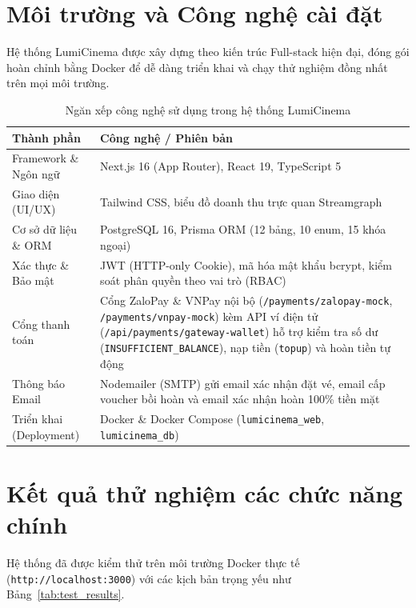 \section{Môi trường và Công nghệ cài đặt}
Hệ thống LumiCinema được xây dựng theo kiến trúc Full-stack hiện đại, đóng gói hoàn chỉnh bằng Docker để dễ dàng triển khai và chạy thử nghiệm đồng nhất trên mọi môi trường.

\begin{table}[H]
\centering
\caption{Ngăn xếp công nghệ sử dụng trong hệ thống LumiCinema}
\label{tab:tech_stack}
\renewcommand{\arraystretch}{1.25}
\begin{tabular}{|p{3.8cm}|p{11.4cm}|}
\hline
\rowcolor{headerblue} \textbf{Thành phần} & \textbf{Công nghệ / Phiên bản} \\ \hline
Framework \& Ngôn ngữ & Next.js 16 (App Router), React 19, TypeScript 5 \\ \hline
Giao diện (UI/UX) & Tailwind CSS, biểu đồ doanh thu trực quan Streamgraph \\ \hline
Cơ sở dữ liệu \& ORM & PostgreSQL 16, Prisma ORM (12 bảng, 10 enum, 15 khóa ngoại) \\ \hline
Xác thực \& Bảo mật & JWT (HTTP-only Cookie), mã hóa mật khẩu bcrypt, kiểm soát phân quyền theo vai trò (RBAC) \\ \hline
Cổng thanh toán & Cổng ZaloPay \& VNPay nội bộ (\texttt{/payments/zalopay-mock}, \texttt{/payments/vnpay-mock}) kèm API ví điện tử (\texttt{/api/payments/gateway-wallet}) hỗ trợ kiểm tra số dư (\texttt{INSUFFICIENT\_BALANCE}), nạp tiền (\texttt{topup}) và hoàn tiền tự động \\ \hline
Thông báo Email & Nodemailer (SMTP) gửi email xác nhận đặt vé, email cấp voucher bồi hoàn và email xác nhận hoàn 100\% tiền mặt \\ \hline
Triển khai (Deployment) & Docker \& Docker Compose (\texttt{lumicinema\_web}, \texttt{lumicinema\_db}) \\ \hline
\end{tabular}
\end{table}

\section{Kết quả thử nghiệm các chức năng chính}
Hệ thống đã được kiểm thử trên môi trường Docker thực tế (\texttt{http://localhost:3000}) với các kịch bản trọng yếu như Bảng~\ref{tab:test_results}.

